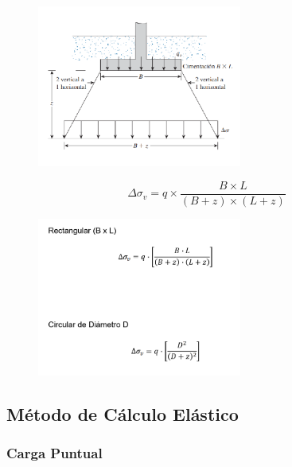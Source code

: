 \documentclass{article} %
\begin{document}
\begin{figure}[H]
    \centering
    \includegraphics[width=0.6\textwidth]{Graficos/emp2.png}
    \label{fig:incremento_esfuerzo_vertical}
\end{figure}

\begin{equation}
    \Delta \sigma_v = q \times \frac{B \times L}{(B+z) \times (L+z)}
\end{equation}

\begin{figure}[H]
    \centering
    \includegraphics[width=0.6\textwidth]{Graficos/emp21.png}
    \label{fig:incremento_esfuerzo_vertical}
\end{figure}
\subsection*{Método de Cálculo Elástico}
\subsubsection*{Carga Puntual}
\end{document}
